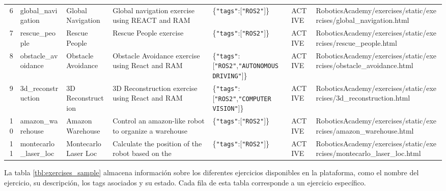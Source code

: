 \documentclass[a4paper, 12pt]{book}
\begin{document}
\begin{table}[!htb]
\begin{tabular}{r l l l l l l}
6  & global\_navigation     & Global Navigation      & Global navigation exercise using REACT and RAM                                                                                  & \{\texttt{"tags"}:[\texttt{"ROS2"}]\}                                  & ACTIVE         & RoboticsAcademy/exercises/static/exercises/global\_navigation.html    \\
7  & rescue\_people         & Rescue People          & Rescue People exercise                                                                                                          & \{\texttt{"tags"}:[\texttt{"ROS2"}]\}                                  & ACTIVE         & RoboticsAcademy/exercises/static/exercises/rescue\_people.html        \\
8  & obstacle\_avoidance    & Obstacle Avoidance     & Obstacle Avoidance exercise using React and RAM                                                                                 & \{\texttt{"tags"}:[\texttt{"ROS2"},\texttt{"AUTONOMOUS DRIVING"}]\}    & ACTIVE         & RoboticsAcademy/exercises/static/exercises/obstacle\_avoidance.html   \\
9  & 3d\_reconstruction     & 3D Reconstruction      & 3D Reconstruction exercise using React and RAM                                                                                 & \{\texttt{"tags"}:[\texttt{"ROS2"},\texttt{"COMPUTER VISION"}]\}       & ACTIVE         & RoboticsAcademy/exercises/static/exercises/3d\_reconstruction.html    \\
10 & amazon\_warehouse      & Amazon Warehouse       & Control an amazon-like robot to organize a warehouse                                                                            & \{\texttt{"tags"}:[\texttt{"ROS2"}]\}                                  & ACTIVE         & RoboticsAcademy/exercises/static/exercises/amazon\_warehouse.html     \\
11 & montecarlo\_laser\_loc & Montecarlo Laser Loc   & Calculate the position of the robot based on the                                                                                 & \{\texttt{"tags"}:[\texttt{"ROS2"}]\}                                  & ACTIVE         & RoboticsAcademy/exercises/static/exercises/montecarlo\_laser\_loc.html \\
\bottomrule
\end{tabular}
\end{table}

La tabla \ref{tbl:exercises_sample} almacena información sobre los diferentes ejercicios disponibles en la plataforma, como el nombre del ejercicio, su descripción, los tags asociados y su estado. Cada fila de esta tabla corresponde a un ejercicio específico.
\end{document}
